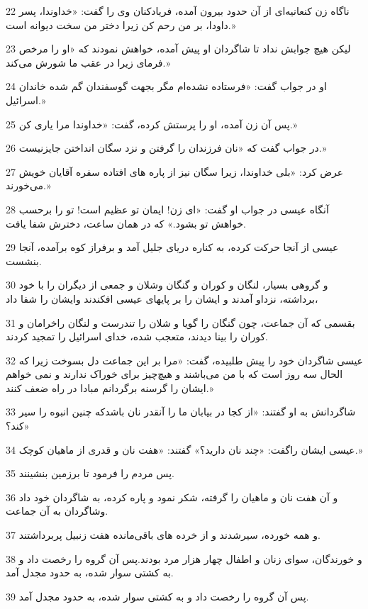 \par 22 ناگاه زن کنعانیه‌ای از آن حدود بیرون آمده، فریاد‌کنان وی را گفت: «خداوندا، پسر داودا، بر من رحم کن زیرا دختر من سخت دیوانه است.»
\par 23 لیکن هیچ جوابش نداد تا شاگردان او پیش آمده، خواهش نمودند که «او را مرخص فرمای زیرا در عقب ما شورش می‌کند.»
\par 24 او در جواب گفت: «فرستاده نشده‌ام مگر بجهت گوسفندان گم شده خاندان اسرائیل.»
\par 25 پس آن زن آمده، او را پرستش کرده، گفت: «خداوندا مرا یاری کن.»
\par 26 در جواب گفت که «نان فرزندان را گرفتن و نزد سگان انداختن جایزنیست.»
\par 27 عرض کرد: «بلی خداوندا، زیرا سگان نیز از پاره های افتاده سفره آقایان خویش می‌خورند.»
\par 28 آنگاه عیسی در جواب او گفت: «ای زن! ایمان تو عظیم است! تو را برحسب خواهش تو بشود.» که در همان ساعت، دخترش شفا یافت.
\par 29 عیسی از آنجا حرکت کرده، به کناره دریای جلیل آمد و برفراز کوه برآمده، آنجا بنشست.
\par 30 و گروهی بسیار، لنگان و کوران و گنگان وشلان و جمعی از دیگران را با خود برداشته، نزداو آمدند و ایشان را بر پایهای عیسی افکندند وایشان را شفا داد،
\par 31 بقسمی که آن جماعت، چون گنگان را گویا و شلان را تندرست و لنگان راخرامان و کوران را بینا دیدند، متعجب شده، خدای اسرائیل را تمجید کردند.
\par 32 عیسی شاگردان خود را پیش طلبیده، گفت: «مرا بر این جماعت دل بسوخت زیرا که الحال سه روز است که با من می‌باشند و هیچ‌چیز برای خوراک ندارند و نمی خواهم ایشان را گرسنه برگردانم مبادا در راه ضعف کنند.»
\par 33 شاگردانش به او گفتند: «از کجا در بیابان ما را آنقدر نان باشدکه چنین انبوه را سیر کند؟»
\par 34 عیسی ایشان راگفت: «چند نان دارید؟» گفتند: «هفت نان و قدری از ماهیان کوچک.»
\par 35 پس مردم را فرمود تا برزمین بنشینند.
\par 36 و آن هفت نان و ماهیان را گرفته، شکر نمود و پاره کرده، به شاگردان خود داد وشاگردان به آن جماعت.
\par 37 و همه خورده، سیرشدند و از خرده های باقی‌مانده هفت زنبیل پربرداشتند.
\par 38 و خورندگان، سوای زنان و اطفال چهار هزار مرد بودند.پس آن گروه را رخصت داد و به کشتی سوار شده، به حدود مجدل آمد.
\par 39 پس آن گروه را رخصت داد و به کشتی سوار شده، به حدود مجدل آمد.

